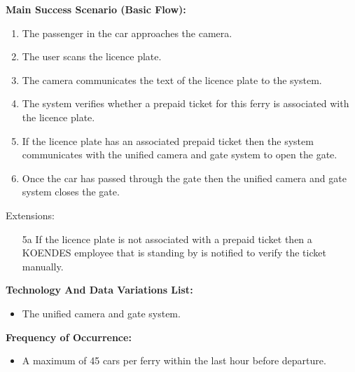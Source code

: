 \textbf{Main Success Scenario (Basic Flow):}
\begin{enumerate}
\item The passenger in the car approaches the camera.
\item The user scans the licence plate.
\item The camera communicates the text of the licence plate to the system.
\item The system verifies whether a prepaid ticket for this ferry is associated with the licence plate.
\item If the licence plate has an associated prepaid ticket then the system communicates with the unified camera and gate system to open the gate. 
\item Once the car has passed through the gate then the unified camera and gate system closes the gate.
\end{enumerate}
Extensions:
\begin{enumerate}
\item[5a]If the licence plate is not associated with a prepaid ticket then a KOENDES employee that is standing by is notified to verify the ticket manually. 
\end{enumerate}


\textbf{Technology And Data Variations List:} 
\begin{itemize}
    \item The unified camera and gate system.
    \end{itemize}
\textbf{Frequency of Occurrence:} 
\begin{itemize}
    \item A maximum of 45 cars per ferry within the last hour before departure.
\end{itemize} 

